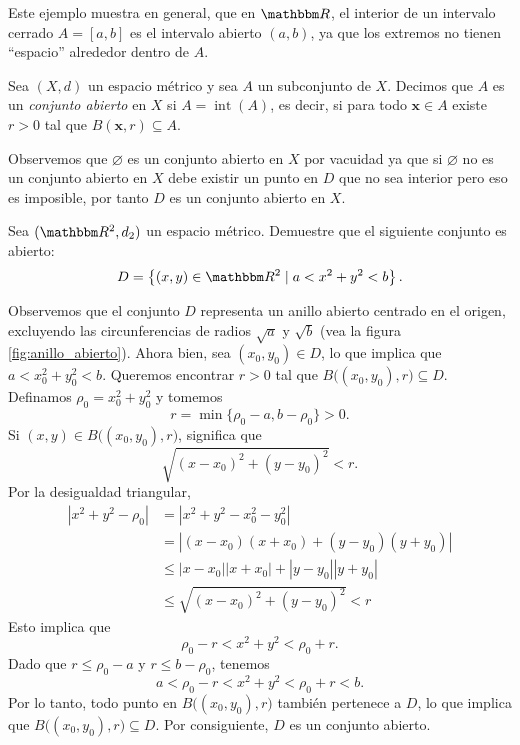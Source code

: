 Este ejemplo muestra en general, que en $\RR$, el interior de un intervalo cerrado $A = [a, b]$ es el intervalo abierto $(a, b)$, ya que los extremos no tienen “espacio” alrededor dentro de $A$.

\begin{definicion}{}{}
    Sea $(X, d)$ un espacio métrico y sea $A$ un subconjunto de $X$. Decimos que $A$ es un \emph{conjunto abierto} en $X$ si $A = \operatorname{int}(A)$, es decir, si para todo $\mathbf{x} \in A$ existe $r > 0$ tal que $B(\mathbf{x}, r) \subseteq A$.
\end{definicion}

Observemos que $\varnothing$ es un conjunto abierto en $X$ por vacuidad ya que si $\varnothing$ no es un conjunto abierto en $X$ debe existir un punto en $D$ que no sea interior pero eso es imposible, por tanto $D$ es un conjunto abierto en $X$.


\begin{examplebox}{}{}
    Sea $(\RR[2], d_2)$ un espacio métrico. Demuestre que el siguiente conjunto es abierto:
    $$D = \left\{ (x, y) \in \RR[2] \mid a < x^2 + y^2 < b \right\}.$$

    \tcblower
    \demostracion Observemos que el conjunto $D$ representa un anillo abierto centrado en el origen, excluyendo las circunferencias de radios $\sqrt{a}$ y $\sqrt{b}$ (vea la figura \ref{fig:anillo_abierto}). Ahora bien, sea $(x_0, y_0) \in D$, lo que implica que $a < x_0^2 + y_0^2 < b$. Queremos encontrar $r > 0$ tal que $B\big((x_0, y_0), r\big) \subseteq D$. Definamos $\rho_0 = x_0^2 + y_0^2$ y tomemos
    $$r = \min \{\rho_0 - a, b - \rho_0\} > 0.$$
    Si $(x, y) \in B\big((x_0, y_0), r\big)$, significa que
    $$\sqrt{(x - x_0)^2 + (y - y_0)^2} < r.$$
    Por la desigualdad triangular,
    \begin{align*}
        \left|x^2 + y^2 - \rho_0\right| & = \left|x^2 + y^2 - x_0^2 - y_0^2\right| \\
        & = |(x - x_0)(x + x_0) + (y - y_0)(y + y_0)| \\
        & \leq |x - x_0| |x + x_0| + |y - y_0| |y + y_0| \\
        & \leq \sqrt{(x - x_0)^2 + (y - y_0)^2} < r
    \end{align*}
    Esto implica que
    $$\rho_0 - r < x^2 + y^2 < \rho_0 + r.$$
    Dado que $r \leq \rho_0 - a$ y $r \leq b - \rho_0$, tenemos
    $$a < \rho_0 - r < x^2 + y^2 < \rho_0 + r < b.$$
    Por lo tanto, todo punto en $B\big((x_0, y_0), r\big)$ también pertenece a $D$, lo que implica que $B\big((x_0, y_0), r\big) \subseteq D$. Por consiguiente, $D$ es un conjunto abierto.
\end{examplebox}

